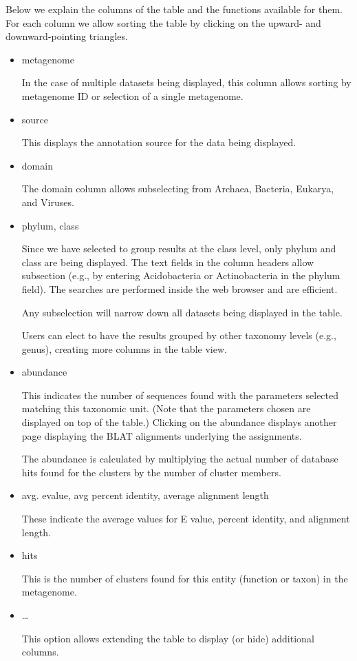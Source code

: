 \documentclass[letterpaper,10pt,english]{sphinxmanual}
\begin{document}
Below we explain the columns of the table and the functions available
for them. For each column we allow sorting the table by clicking on the
upward- and downward-pointing triangles.
\begin{itemize}
\item {} 
metagenome

In the case of multiple datasets being displayed, this column allows
sorting by metagenome ID or selection of a single metagenome.

\item {} 
source

This displays the annotation source for the data being displayed.

\item {} 
domain

The domain column allows subselecting from Archaea, Bacteria,
Eukarya, and Viruses.

\item {} 
phylum, class

Since we have selected to group results at the class level, only
phylum and class are being displayed. The text fields in the column
headers allow subsection (e.g., by entering Acidobacteria or
Actinobacteria in the phylum field). The searches are performed
inside the web browser and are efficient.

Any subselection will narrow down all datasets being displayed in the
table.

Users can elect to have the results grouped by other taxonomy levels
(e.g., genus), creating more columns in the table view.

\item {} 
abundance

This indicates the number of sequences found with the parameters
selected matching this taxonomic unit. (Note that the parameters
chosen are displayed on top of the table.) Clicking on the abundance
displays another page displaying the BLAT alignments underlying the
assignments.

The abundance is calculated by multiplying the actual number of
database hits found for the clusters by the number of cluster
members.

\item {} 
avg. evalue, avg percent identity, average alignment length

These indicate the average values for E value, percent identity, and
alignment length.

\item {} 
hits

This is the number of clusters found for this entity (function or
taxon) in the metagenome.

\item {} 
…

This option allows extending the table to display (or hide)
additional columns.

\end{itemize}
\end{document}
